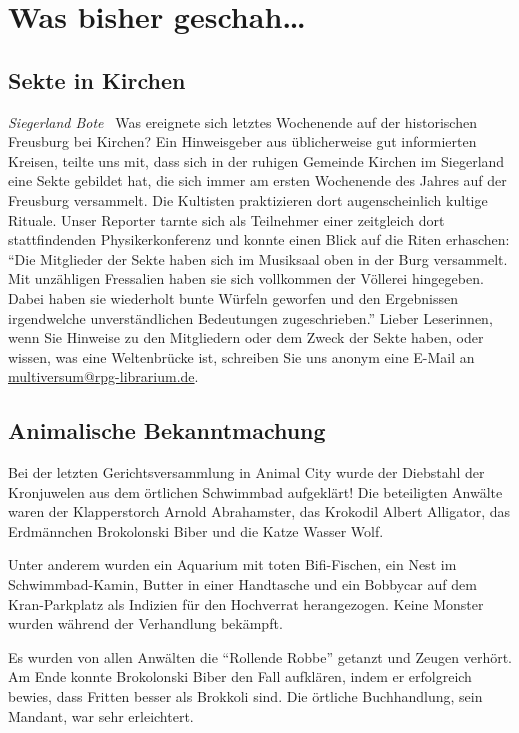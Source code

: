 \documentclass[final]{multiversum}
\begin{document}
\makemultititle
%

\section{Was bisher geschah\ldots}

\subsection{Sekte in Kirchen}
\textit{Siegerland Bote} \textendash\ Was ereignete sich letztes Wochenende auf
der historischen Freusburg bei Kirchen? Ein Hinweisgeber aus üblicherweise gut
informierten Kreisen, teilte uns mit, dass sich in der ruhigen Gemeinde Kirchen
im Siegerland eine Sekte gebildet hat, die sich immer am ersten Wochenende des
Jahres auf der Freusburg versammelt. Die Kultisten praktizieren dort
augenscheinlich kultige Rituale. Unser Reporter tarnte sich als Teilnehmer einer
zeitgleich dort stattfindenden Physikerkonferenz und konnte einen Blick auf die
Riten erhaschen: \enquote{Die Mitglieder der Sekte haben sich im Musiksaal oben
in der Burg versammelt. Mit unzähligen Fressalien haben sie sich vollkommen der
Völlerei hingegeben. Dabei haben sie wiederholt bunte Würfeln geworfen und den
Ergebnissen irgendwelche unverständlichen Bedeutungen zugeschrieben.} Lieber
Leserinnen, wenn Sie Hinweise zu den Mitgliedern oder dem Zweck der Sekte
haben, oder wissen, was eine Weltenbrücke ist, schreiben Sie uns anonym eine
E-Mail an \url{multiversum@rpg-librarium.de}.


\subsection{Animalische Bekanntmachung}
Bei der letzten Gerichtsversammlung in Animal City wurde der Diebstahl der
Kronjuwelen aus dem örtlichen Schwimmbad aufgeklärt!  Die beteiligten Anwälte
waren der Klapperstorch Arnold Abrahamster, das Krokodil Albert Alligator, das
Erdmännchen Brokolonski Biber und die Katze Wasser Wolf.

Unter anderem wurden
ein Aquarium mit toten Bifi-Fischen, ein Nest im Schwimmbad-Kamin, Butter in
einer Handtasche und ein Bobbycar auf dem Kran-Parkplatz als Indizien für den
Hochverrat herangezogen.  Keine Monster wurden während der Verhandlung bekämpft.

Es wurden von allen Anwälten die \enquote{Rollende Robbe} getanzt und Zeugen
verhört.  Am Ende konnte Brokolonski Biber den Fall aufklären, indem er
erfolgreich bewies, dass Fritten besser als Brokkoli sind.  Die örtliche
Buchhandlung, sein Mandant, war sehr erleichtert.
\end{document}
